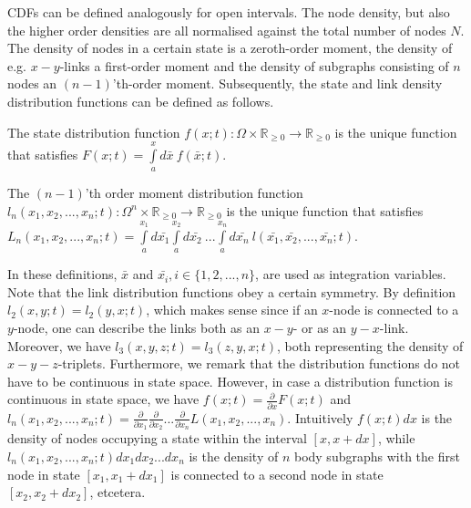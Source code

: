 CDFs can be defined analogously for open intervals. The node density, but also the higher order densities are all normalised against the total number of nodes $N$. The density of nodes in a certain state is a zeroth-order moment, the density of e.g. $x-y$-links a first-order moment and the density of subgraphs consisting of $n$ nodes an $(n-1)$'th-order moment. Subsequently, the state and link density distribution functions can be defined as follows.  
\begin{definition}
	The state distribution function $f(x;t) : \Omega \times \mathbb{R}_{\ge0} \to  \mathbb{R}_{\ge0}$ is the unique function that satisfies $F(x;t) = \int\limits_a^x d\bar{x}\ f(\bar{x};t)$.
\end{definition}
\begin{definition}
	The $(n-1)$'th order moment distribution function $l_n(x_1,x_2,...,x_n;t): \Omega^n \times \mathbb{R}_{\ge0} \to  \mathbb{R}_{\ge0}$ is the unique function that satisfies $L_n(x_1,x_2,...,x_n;t) = \int\limits_a^{x_{1}} d\bar{x_1} \int\limits_a^{x_{2}} d\bar{x_2}\ ... \int\limits_a^{x_n} d\bar{x_n}\  l(\bar{x_1}, \bar{x_2},...,\bar{x_n};t)$.
\end{definition}
In these definitions, $\bar{x}$ and $\bar{x_i}, i \in \{1,2,...,n\}$, are used as integration variables. Note that the link distribution functions obey a certain symmetry. By definition $l_2(x,y;t) = l_2(y,x;t)$, which makes sense since if an $x$-node is connected to a $y$-node, one can describe the links both as an $x-y$- or as an $y-x$-link. Moreover, we have $l_3(x,y,z;t) = l_3(z,y,x;t)$, both representing the density of $x-y-z$-triplets.  Furthermore, we remark that the distribution functions do not have to be continuous in state space. However, in case a distribution function is continuous in state space, we have $f(x;t) = \frac{\partial}{\partial x} F(x;t)$ and $l_n(x_1,x_2,...,x_n;t) = \frac{\partial}{\partial x_1} \frac{\partial}{\partial x_2} ... \frac{\partial}{\partial x_n} L(x_1, x_2,...,x_n)$. Intuitively $f(x;t)dx$ is the density of nodes occupying a state within the interval $[x,x+dx]$, while $ l_n(x_1, x_2,...,x_n;t)dx_1dx_2...dx_n$ is the density of $n$ body subgraphs with the first node in state $[x_1,x_1+dx_1]$ is connected to a second node in state $[x_2,x_2+dx_2]$, etcetera. 

